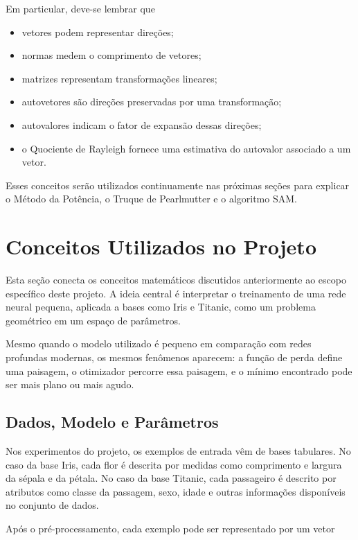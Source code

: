 \documentclass[12pt, a4paper]{article}
\begin{document}
Em particular, deve-se lembrar que

\begin{itemize}
\item vetores podem representar direções;
\item normas medem o comprimento de vetores;
\item matrizes representam transformações lineares;
\item autovetores são direções preservadas por uma transformação;
\item autovalores indicam o fator de expansão dessas direções;
\item o Quociente de Rayleigh fornece uma estimativa do autovalor associado a
um vetor.
\end{itemize}

Esses conceitos serão utilizados continuamente nas próximas seções para
explicar o Método da Potência, o Truque de Pearlmutter e o algoritmo SAM.




\section{Conceitos Utilizados no Projeto}

Esta seção conecta os conceitos matemáticos discutidos anteriormente ao
escopo específico deste projeto. A ideia central é interpretar o treinamento
de uma rede neural pequena, aplicada a bases como Iris e Titanic, como um
problema geométrico em um espaço de parâmetros.

Mesmo quando o modelo utilizado é pequeno em comparação com redes profundas
modernas, os mesmos fenômenos aparecem: a função de perda define uma paisagem,
o otimizador percorre essa paisagem, e o mínimo encontrado pode ser mais plano
ou mais agudo.

\subsection{Dados, Modelo e Parâmetros}

Nos experimentos do projeto, os exemplos de entrada vêm de bases tabulares.
No caso da base Iris, cada flor é descrita por medidas como comprimento e
largura da sépala e da pétala. No caso da base Titanic, cada passageiro é
descrito por atributos como classe da passagem, sexo, idade e outras
informações disponíveis no conjunto de dados.

Após o pré-processamento, cada exemplo pode ser representado por um vetor
\end{document}
